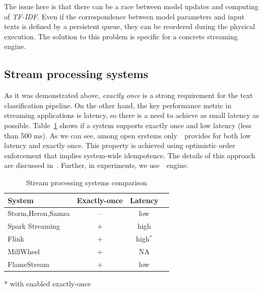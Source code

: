 The issue here is that there can be a race between model updates and computing of {\em TF-IDF}. Even if the correspondence between model parameters and input texts is defined by a persistent queue, they can be reordered during the physical execution. The solution to this problem is specific for a concrete streaming engine.

\subsection{Stream processing systems}

As it was demonstrated above, {\em exactly once} is a strong requirement for the text classification pipeline. On the other hand, the key performance metric in streaming applications is latency, so there is a need to achieve as small latency as possible. Table~\ref{comparison} shows if a system supports exactly once and low latency (less than 500 ms). As we can see, among open systems only~\FlameStream\ provides for both low latency and exactly once. This property is achieved using optimistic order enforcement that implies system-wide idempotence. The details of this approach are discussed in~\cite{we2018adbis, we2018beyondmr}. Further, in experiments, we use~\FlameStream\ engine.

\begin{table}[htbp]

\begin{threeparttable}
\begin{tabular}{lccl}

System             & Exactly-once & Latency    \\
\hline
Storm,Heron,Samza        &    --   &   low            \\
Spark Streaming    &    +    &   high           \\
Flink              &    +     &    high$^*$       \\
MillWheel          &    +    &   NA             \\
FlameStream        &    +    &   low            \\

\end{tabular}

* with enabled exactly-once~\cite{we2018beyondmr}

\end{threeparttable}

\caption{Stream processing systems comparison}
\label{comparison}
\end{table}